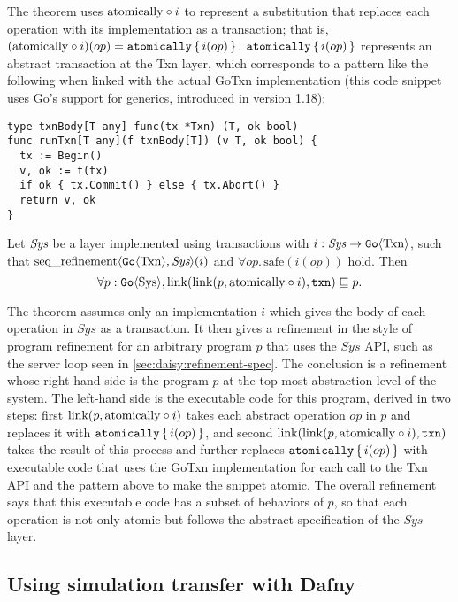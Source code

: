 The theorem uses
$\mathrm{atomically}\circ i$ to represent a substitution that replaces each operation with
its implementation as a transaction; that is,
$(\mathrm{atomically}\circ i)(op) = \mathtt{atomically}\,\{\, i(op) \,\}$. $\mathtt{atomically}\,\{\, i(op) \,\}$ represents an
abstract transaction at the Txn layer, which corresponds to a pattern like the
following when linked with the actual GoTxn implementation (this code snippet
uses Go's support for generics, introduced in version 1.18):

\begin{verbatim}
type txnBody[T any] func(tx *Txn) (T, ok bool)
func runTxn[T any](f txnBody[T]) (v T, ok bool) {
  tx := Begin()
  v, ok := f(tx)
  if ok { tx.Commit() } else { tx.Abort() }
  return v, ok
}
\end{verbatim}

\begin{theorem}
  Let $\textit{Sys}$ be a layer implemented using transactions with
$i : \textit{Sys} \to \mathtt{Go}\langle \mathrm{Txn} \rangle$, such that
$\operatorname{seq\_refinement}\langle \mathtt{Go}\langle \mathrm{Txn} \rangle, \textit{Sys} \rangle(i)$ and
$\forall op.\, \mathrm{safe}(i(op))$ hold. Then
\[
  \forall p : \mathtt{Go}\langle \mathrm{Sys} \rangle, \mathrm{link}(\mathrm{link}(p, \mathrm{atomically}\circ i), \texttt{txn}) \sqsubseteq p.
\]
\label{thm:gotxn-transfer}
\end{theorem}

The theorem assumes only an implementation $i$ which gives the body of each
operation in $\mathit{Sys}$ as a transaction. It then gives a refinement in the
style of program refinement for an arbitrary program $p$ that uses the
$\mathit{Sys}$ API, such as the server loop seen in
\cref{sec:daisy:refinement-spec}. The conclusion is a refinement whose
right-hand side is the program $p$ at the top-most abstraction level of the
system. The left-hand side is the executable code for this program, derived in
two steps: first $\mathrm{link}(p, \mathrm{atomically}\circ i)$ takes each abstract operation
$op$ in $p$ and replaces it with $\mathtt{atomically}\,\{\, i(op) \,\}$, and second
$\mathrm{link}(\mathrm{link}(p, \mathrm{atomically}\circ i), \texttt{txn})$ takes the result of this process and
further replaces $\mathtt{atomically}\,\{\, i(op) \,\}$ with executable code that uses the GoTxn
implementation for each call to the Txn API and the  pattern above to
make the snippet atomic. The overall refinement says that this executable code
has a subset of behaviors of $p$, so that each operation is not only atomic but
follows the abstract specification of the $\mathit{Sys}$ layer.

\subsection{Using simulation transfer with Dafny}%
\label{sec:daisy:proof-dafny}

